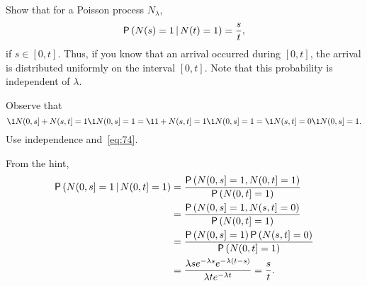 \begin{extra}
Show that  for a Poisson process $N_\lambda$, 
\begin{equation*}
\P{N(s) =1\given N(t)=1} = \frac s t,
\end{equation*}
if $s\in[0,t]$. Thus, if you know that an arrival occurred during $[0,t]$, the arrival is distributed
uniformly on the interval $[0,t]$. Note that this probability is independent of $\lambda$. 
\begin{hint}
 Observe that 
  \begin{equation*}
\1{N(0,s]+N(s,t]=1}\1{N(0,s]=1} = \1{1+N(s,t]=1}\1{N(0,s]=1}=\1{N(s,t]=0}\1{N(0,s]=1}.
  \end{equation*}
Use  independence and~\cref{eq:74}.
\end{hint}
\begin{solution}
From the hint,
\begin{align*}
  \P{N(0,s] =1\given N(0,t]=1} 
&= \frac{\P{N(0,s] =1, N(0,t]=1}}{\P{N(0,t]=1}} \\
&= \frac{\P{N(0,s] =1, N(s,t]=0}}{\P{N(0,t]=1}} \\
&= \frac{\P{N(0,s] =1}\P{N(s,t]=0}}{\P{N(0,t]=1}} \\
&= \frac{\lambda s e^{-\lambda s} e^{-\lambda (t-s)}}{\lambda t e^{-\lambda t}} = \frac s t.
\end{align*}
\end{solution}
\end{extra}
 
